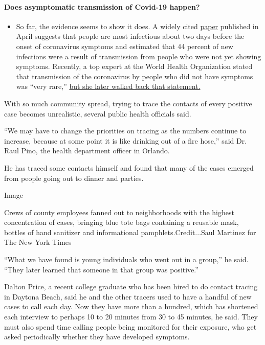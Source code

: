 \begin{itemize}
{  \paragraph{Does asymptomatic transmission of Covid-19
  happen?}\label{does-asymptomatic-transmission-of-covid-19-happen}}

  \begin{itemize}
  \tightlist
  \item
    So far, the evidence seems to show it does. A widely cited
    \href{https://www.nature.com/articles/s41591-020-0869-5}{paper}
    published in April suggests that people are most infectious about
    two days before the onset of coronavirus symptoms and estimated that
    44 percent of new infections were a result of transmission from
    people who were not yet showing symptoms. Recently, a top expert at
    the World Health Organization stated that transmission of the
    coronavirus by people who did not have symptoms was ``very rare,''
    \href{https://www.nytimes.com/2020/06/09/world/coronavirus-updates.html?action=click\&pgtype=Article\&state=default\&region=MAIN_CONTENT_3\&context=storylines_faq\#link-1f302e21}{but
    she later walked back that statement.}
  \end{itemize}
\end{itemize}

With so much community spread, trying to trace the contacts of every
positive case becomes unrealistic, several public health officials said.

``We may have to change the priorities on tracing as the numbers
continue to increase, because at some point it is like drinking out of a
fire hose,'' said Dr. Raul Pino, the health department officer in
Orlando.

He has traced some contacts himself and found that many of the cases
emerged from people going out to dinner and parties.

Image

Crews of county employees fanned out to neighborhoods with the highest
concentration of cases, bringing blue tote bags containing a reusable
mask, bottles of hand sanitizer and informational
pamphlets.Credit...Saul Martinez for The New York Times

``What we have found is young individuals who went out in a group,'' he
said. ``They later learned that someone in that group was positive.''

Dalton Price, a recent college graduate who has been hired to do contact
tracing in Daytona Beach, said he and the other tracers used to have a
handful of new cases to call each day. Now they have more than a
hundred, which has shortened each interview to perhaps 10 to 20 minutes
from 30 to 45 minutes, he said. They must also spend time calling people
being monitored for their exposure, who get asked periodically whether
they have developed symptoms.

